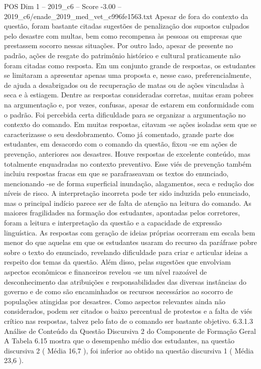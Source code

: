 \begin{textsample}{POS Dim 1 – 2019\_c6 – Score -3.00 – 2019\_c6/enade\_2019\_med\_vet\_c996fe1563.txt}
Apesar de fora do contexto da questão, foram bastante citadas sugestões de penalização dos supostos culpados pelo desastre com multas, bem como recompensa às pessoas ou empresas que prestassem socorro nessas situações.
Por outro lado, apesar de presente no padrão, ações de resgate do patrimônio histórico e cultural praticamente não foram citadas como resposta.
Em um conjunto grande de respostas, os estudantes se limitaram a apresentar apenas uma proposta e, nesse caso, preferencialmente, de ajuda a desabrigados ou de recuperação de matas ou de ações vinculadas à seca e à estiagem.
Dentre as respostas consideradas corretas, muitas eram pobres na argumentação e, por vezes, confusas, apesar de estarem em conformidade com o padrão.
Foi percebida certa dificuldade para se organizar a argumentação no contexto do comando.
Em muitas respostas, citavam -se ações isoladas sem que se caracterizasse o seu desdobramento.
Como já comentado, grande parte dos estudantes, em desacordo com o comando da questão, fixou -se em ações de prevenção, anteriores aos desastres.
Houve respostas de excelente conteúdo, mas totalmente enquadradas no contexto preventivo.
Esse viés de prevenção também incluiu respostas fracas em que se parafraseavam os textos do enunciado, mencionando -se de forma superficial inundação, alagamentos, seca e redução dos níveis de risco.
A interpretação incorreta pode ter sido induzida pelo enunciado, mas o principal indício parece ser de falta de atenção na leitura do comando.
As maiores fragilidades na formação dos estudantes, apontadas pelos corretores, foram a leitura e interpretação da questão e a capacidade de expressão linguística.
As respostas com geração de ideias próprias ocorreram em escala bem menor do que aquelas em que os estudantes usaram do recurso da paráfrase pobre sobre o texto do enunciado, revelando dificuldade para criar e articular ideias a respeito dos temas da questão.
Além disso, pelas sugestões que envolviam aspectos econômicos e financeiros revelou -se um nível razoável de desconhecimento das atribuições e responsabilidades das diversas instâncias do governo e de como são encaminhados os recursos necessários ao socorro de populações atingidas por desastres.
Como aspectos relevantes ainda não considerados, podem ser citados o baixo percentual de protestos e a falta de viés crítico nas respostas, talvez pelo fato de o comando ser bastante objetivo. 6.3.1.3 Análise de Conteúdo da Questão Discursiva 2 do Componente de Formação Geral A Tabela 6.15 mostra que o desempenho médio dos estudantes, na questão discursiva 2 ( Média 16,7 ), foi inferior ao obtido na questão discursiva 1 ( Média 23,6 ).

\end{textsample}
